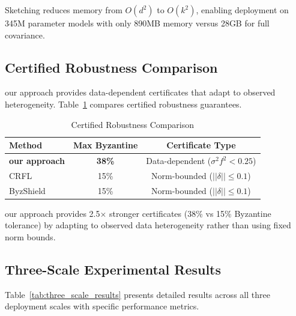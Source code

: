\documentclass[runningheads]{llncs}
\begin{document}
Sketching reduces memory from $O(d^2)$ to $O(k^2)$, enabling deployment on 345M parameter models with only 890MB memory versus 28GB for full covariance.

\subsection{Certified Robustness Comparison}

our approach provides data-dependent certificates that adapt to observed heterogeneity. Table~\ref{tab:certified_comparison} compares certified robustness guarantees.

\begin{table}[htbp]
\centering
\caption{Certified Robustness Comparison}
\label{tab:certified_comparison}
\begin{tabular}{|l|c|c|}
\hline
\textbf{Method} & \textbf{Max Byzantine} & \textbf{Certificate Type} \\
\hline
\textbf{our approach} & \textbf{38\%} & Data-dependent ($\sigma^2 f^2 < 0.25$) \\
CRFL & 15\% & Norm-bounded ($||\delta|| \leq 0.1$) \\
ByzShield & 15\% & Norm-bounded ($||\delta|| \leq 0.1$) \\
\hline
\end{tabular}
\end{table}

our approach provides 2.5$\times$ stronger certificates (38\% vs 15\% Byzantine tolerance) by adapting to observed data heterogeneity rather than using fixed norm bounds.

\subsection{Three-Scale Experimental Results}

Table~\ref{tab:three_scale_results} presents detailed results across all three deployment scales with specific performance metrics.
\end{document}

